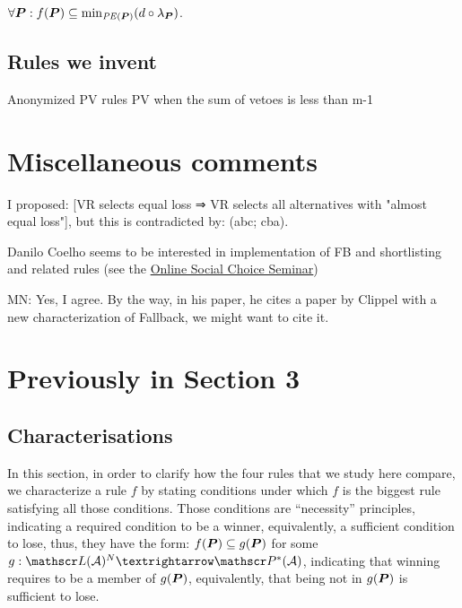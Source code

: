 \documentclass[version=3.21, pagesize, twoside=off, bibliography=totoc, DIV=calc, fontsize=12pt, a4paper]{scrartcl}
\begin{document}
\begin{definition}
	$\forall \prof: f(\prof) \subseteq \mindisp[\PE]$.
\end{definition}



\subsection{Rules we invent}
Anonymized PV rules
PV when the sum of vetoes is less than m-1
\section{Miscellaneous comments}
I proposed: [VR selects equal loss ⇒ VR selects all alternatives with "almost equal loss"], but this is contradicted by: (abc; cba).


Danilo Coelho seems to be interested in implementation of FB and shortlisting and related rules (see the \href{https://www.cmss.auckland.ac.nz/2020/06/03/online-social-choice-seminar-series/}{Online Social Choice Seminar})

\color{green}MN: Yes, I agree. By the way, in his paper, he cites a paper by Clippel with a new characterization of Fallback, we might want to cite it.\color{black}



\appendix
\section{Previously in Section 3}
\subsection{Characterisations}

In this section, in order to clarify how the four rules that we study here compare, we characterize a rule $f$ by stating conditions under which $f$ is the biggest rule satisfying all those conditions. Those conditions are “necessity” principles, indicating a required condition to be a winner, equivalently, a sufficient condition to lose, thus, they have the form: $f(\bm{P}) \subseteq g(\bm{P})$ for some $g: \allprofs → \powersetz{\allalts}$, indicating that winning requires to be a member of $g(\bm{P})$, equivalently, that being not in $g(\bm{P})$ is sufficient to lose.
\end{document}
